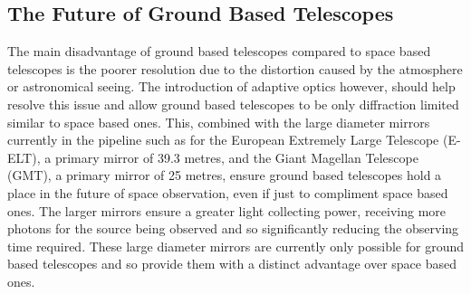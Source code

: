 \documentclass[pdf,color]{UoBnote}
\begin{document}
\subsection{The Future of Ground Based Telescopes}
The main disadvantage of ground based telescopes compared to space based telescopes is the poorer resolution due to the distortion caused by the atmosphere or astronomical seeing. The introduction of adaptive optics however, should help resolve this issue and allow ground based telescopes to be only diffraction limited similar to space based ones. This, combined with the large diameter mirrors currently in the pipeline such as for the European Extremely Large Telescope (E-ELT), a primary mirror of 39.3 metres, and the Giant Magellan Telescope (GMT), a primary mirror of 25 metres, ensure ground based telescopes hold a place in the future of space observation, even if just to compliment space based ones. The larger mirrors ensure a greater light collecting power, receiving more photons for the source being observed and so significantly reducing the observing time required. These large diameter mirrors are currently only possible for ground based telescopes and so provide them with a distinct advantage over space based ones. \\
\end{document}
